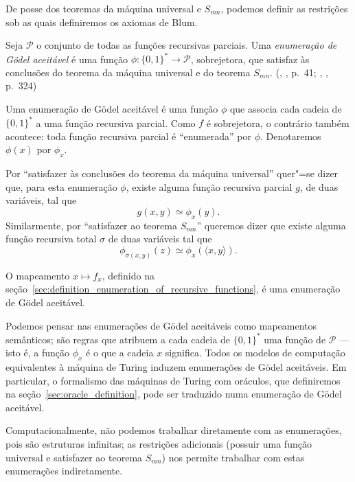 De posse dos teoremas da máquina universal e $S_{mn}$,
podemos definir as restrições sob as quais definiremos os axiomas de Blum.

\begin{definition}
    Seja $\mathcal P$ o conjunto de todas as funções recursivas parciais.
    Uma \emph{enumeração de Gödel aceitável}
    é uma função $\phi: \{0, 1\}^* \to \mathcal P$, sobrejetora,
    que satisfaz às conclusões do teorema da máquina universal
    e do teorema $S_{mn}$.
    (\citeauthor{Rogers1987}, \citeyear{Rogers1987}, p.~41;
    \citeauthor{Blum1967}, \citeyear{Blum1967}, p.~324)
\end{definition}

Uma enumeração de Gödel aceitável é uma função $\phi$ que associa
cada cadeia de $\{0, 1\}^*$ a uma função recursiva parcial.
Como $f$ é sobrejetora,
o contrário também acontece:
toda função recursiva parcial é ``enumerada'' por $\phi$.
Denotaremos $\phi(x)$ por $\phi_x$.

Por ``satisfazer às conclusões do teorema da máquina universal''
quer"=se dizer que,
para esta enumeração $\phi$,
existe alguma função recursiva parcial $g$, de duas variáveis,
tal que
\begin{equation*}
    g(x, y) \simeq \phi_x(y).
\end{equation*}
Similarmente, por ``satisfazer ao teorema $S_{mn}$'' queremos dizer que
existe alguma função recursiva total $\sigma$ de duas variáveis tal que
\begin{equation*}
    \phi_{\sigma(x, y)}(z) \simeq \phi_x(\langle x, y \rangle).
\end{equation*}

\begin{example}
    O mapeamento $x \mapsto f_x$,
    definido na seção~\ref{sec:definition_enumeration_of_recursive_functions},
    é uma enumeração de Gödel aceitável.
\end{example}

Podemos pensar nas enumerações de Gödel aceitáveis
como mapeamentos semânticos;
são regras que atribuem a cada cadeia de $\{0, 1\}^*$
uma função de $\mathcal P$ --- isto é,
a função $\phi_x$ é o que a cadeia $x$ significa.
Todos os modelos de computação equivalentes à máquina de Turing
induzem enumerações de Gödel aceitáveis.
Em particular,
o formalismo das máquinas de Turing com oráculos,
que definiremos na seção~\ref{sec:oracle_definition},
pode ser traduzido numa enumeração de Gödel aceitável.

Computacionalmente,
não podemos trabalhar diretamente com as enumerações,
pois são estruturas infinitas;
as restrições adicionais
(possuir uma função universal e satisfazer ao teorema $S_{mn}$)
nos permite trabalhar com estas enumerações indiretamente.
